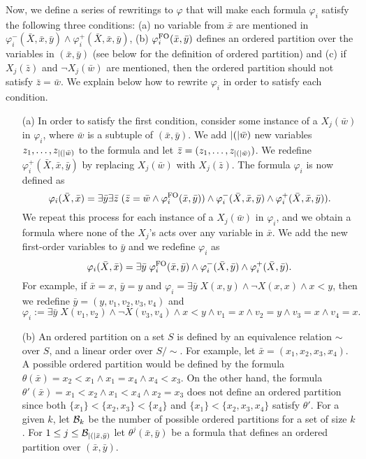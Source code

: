 Now, we define a series of rewritings to $\varphi$ that will make each formula $\varphi_i$ satisfy the following three conditions: (a) no variable from $\bar{x}$ are mentioned in $\varphi_i^{-}(\bar{X},\bar{x},\bar{y})\wedge\varphi_i^{+}(\bar{X},\bar{x},\bar{y})$, (b) $\varphi_i^{{\rm FO}}(\bar{x},\bar{y})$ defines an ordered partition over the variables in $(\bar{x},\bar{y})$ (see below for the definition of ordered partition) and (c) if $X_j(\bar{z})$ and $\neg X_j(\bar{w})$ are mentioned, then the ordered partition should not satisfy $\bar{z} = \bar{w}$.
We explain below how to rewrite $\varphi_i$ in order to satisfy each condition.
\begin{itemize}
	\item[(a)] In order to satisfy the first condition, consider some instance of a $X_j(\bar{w})$ in $\varphi_i$, where $\bar{w}$ is a subtuple of $(\bar{x},\bar{y})$. We add $\vert ( \vert\bar{w})$ new variables $z_1,\ldots,z_{\vert ( \vert\bar{w})}$ to the formula and let $\bar{z} = (z_1,\ldots,z_{\vert ( \vert\bar{w})})$. We redefine $\varphi_i^{+}(\bar{X},\bar{x},\bar{y})$ by replacing $X_j(\bar{w})$ with $X_j(\bar{z})$. The formula $\varphi_i$ is now defined as
	$$
	\varphi_i(\bar{X},\bar{x}) = \exists \bar{y} \exists \bar{z} \; (\bar{z} = \bar{w} \wedge \varphi_i^{{\rm FO}}(\bar{x},\bar{y})) \wedge \varphi_i^{-}(\bar{X},\bar{x},\bar{y}) \wedge \varphi_i^{+}(\bar{X},\bar{x},\bar{y})).
	$$
	We repeat this process for each instance of a $X_j(\bar{w})$ in $\varphi_i$, and we obtain a formula where none of the $X_j$'s acts over any variable in $\bar{x}$. We add the new first-order variables to $\bar{y}$ and we redefine $\varphi_i$ as
	$$
	\varphi_i(\bar{X},\bar{x}) = \exists \bar{y} \; \varphi_i^{{\rm FO}}(\bar{x},\bar{y}) \wedge \varphi_i^{-}(\bar{X},\bar{y}) \wedge \varphi_i^{+}(\bar{X},\bar{y}).
	$$
	For example, if $\bar{x} = x$, $\bar{y} = y$ and $\varphi_i = \exists \bar{y} \;  X(x,y)\wedge \neg X(x,x) \wedge x < y$, then we redefine $\bar{y} = (y,v_1,v_2,v_3,v_4)$ and $\varphi_i := \exists \bar{y} \;  X(v_1,v_2) \wedge \neg X(v_3,v_4) \wedge x < y \wedge v_1 = x \wedge v_2 = y \wedge v_3 = x \wedge v_4 = x.$ 
	\item[(b)] An ordered partition on a set $S$ is defined by an equivalence relation $\sim$ over $S$, and a linear order over $S/\!\sim$. For example, let $\bar{x} = (x_1,x_2,x_3,x_4)$. A possible ordered partition would be defined by the formula $\theta(\bar{x}) = x_2 < x_1 \wedge x_1 = x_4 \wedge x_4 < x_3$. On the other hand, the formula $\theta'(\bar{x}) = x_1 < x_2 \wedge x_1 < x_4 \wedge x_2 = x_3$ does not define an ordered partition since both $\{x_1\}<\{x_2,x_3\}<\{x_4\}$ and $\{x_1\} < \{x_2,x_3,x_4\}$ satisfy $\theta'$.
	For a given $k$, let $\mathcal{B}_k$ be the number of possible ordered partitions for a set of size $k$. For $1 \leq j \leq \mathcal{B}_{\vert ( \vert\bar{x},\bar{y})}$ 
	let $\theta^j(\bar{x},\bar{y})$ be a formula that defines an ordered partition over $(\bar{x},\bar{y})$. 
	

\end{itemize}
